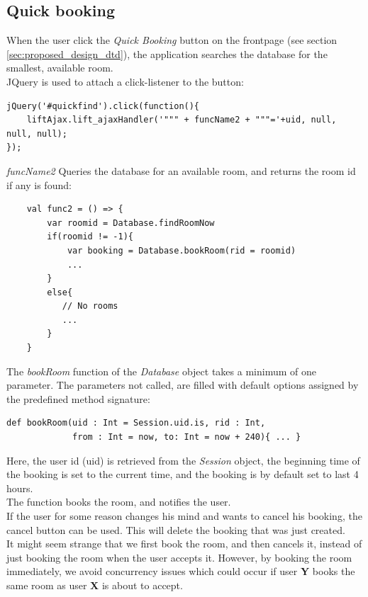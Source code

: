 \subsection{Quick booking}
\label{sub:quickbooking}
When the user click the \emph{Quick Booking} button on the frontpage (see section \ref{sec:proposed_design_dtd}), the application searches the database for the smallest, available room.\\

JQuery is used to attach a click-listener to the button:

\begin{verbatim}
jQuery('#quickfind').click(function(){
    liftAjax.lift_ajaxHandler('""" + funcName2 + """='+uid, null, null, null);
});
\end{verbatim}

\emph{funcName2} Queries the database for an available room, and returns the room id if any is found:

\begin{verbatim}
    val func2 = () => {
        var roomid = Database.findRoomNow
        if(roomid != -1){
            var booking = Database.bookRoom(rid = roomid)
            ...
        }
        else{
           // No rooms
           ...
        }
    }
\end{verbatim}

The \emph{bookRoom} function of the \emph{Database} object takes a minimum of one parameter. The parameters not called, are filled with default options assigned by the predefined method signature:

\begin{verbatim}
def bookRoom(uid : Int = Session.uid.is, rid : Int, 
             from : Int = now, to: Int = now + 240){ ... }
\end{verbatim}

Here, the user id (uid) is retrieved from the \emph{Session} object, the beginning time of the booking is set to the current time, and the booking is by default set to last 4 hours. \\
The function books the room, and notifies the user.\\

If the user for some reason changes his mind and wants to cancel his booking, the cancel button can be used. This will delete the booking that was just created. \\
It might seem strange that we first book the room, and then cancels it, instead of just booking the room when the user accepts it. However, by booking the room immediately, we avoid concurrency issues which could occur if user \textbf{Y} books the same room as user \textbf{X} is about to accept.

